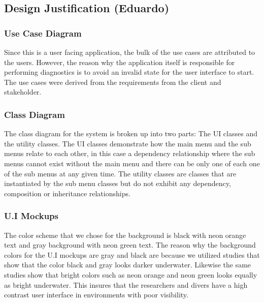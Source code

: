 \subsection{Design Justification (Eduardo)}
\subsubsection{Use Case Diagram}
Since this is a user facing application, the bulk of the use cases are attributed to the users. However, the reason why the application itself is responsible for performing diagnostics is to avoid an invalid state for the user interface to start. The use cases were derived from the requirements from the client and stakeholder.
\subsubsection{Class Diagram}
The class diagram for the system is broken up into two parts: The UI classes and the utility classes. The UI classes demonstrate how the main menu and the sub menus relate to each other, in this case a dependency relationship where the sub menus cannot exist without the main menu and there can be only one of each one of the sub menus at any given time. The utility classes are classes that are instantiated by the sub menu classes but do not exhibit any dependency, composition or inheritance relationships.
\subsubsection{U.I Mockups}
The color scheme that we chose for the background is black with neon orange text and gray background with neon green text. The reason why the background colors for the U.I mockups are gray and black are because we utilized studies that show that the color black and gray looks darker underwater.\cite{AquaticSafetyGroup2021}\cite{FluoGreenMost2018} Likewise the same studies show that bright colors such as neon orange and neon green looks equally as bright underwater.\cite{AquaticSafetyGroup2021}\cite{FluoGreenMost2018} This insures that the researchers and divers have a high contrast user interface in environments with poor visibility.